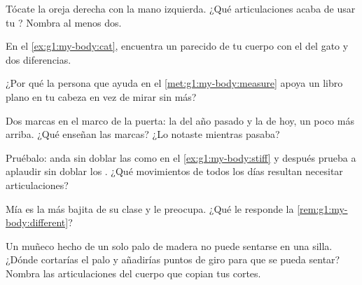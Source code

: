 \begin{exercise}[$\star$]\label{exo:g1:my-body:4}
Tócate la oreja derecha con la mano izquierda. ¿Qué articulaciones
acaba de usar tu ? Nombra al menos dos.
\end{exercise}

\begin{exercise}[$\star$]\label{exo:g1:my-body:5}
En el \cref{ex:g1:my-body:cat}, encuentra un parecido de tu cuerpo con
el del gato y dos diferencias.
\end{exercise}

\begin{exercise}[$\star$]\label{exo:g1:my-body:6}
¿Por qué la persona que ayuda en el \cref{met:g1:my-body:measure}
apoya un libro plano en tu cabeza en vez de mirar sin más?
\end{exercise}

\begin{exercise}[$\star$]\label{exo:g1:my-body:7}
Dos marcas en el marco de la puerta: la del año pasado y la de hoy, un
poco más arriba. ¿Qué enseñan las marcas? ¿Lo notaste mientras pasaba?
\end{exercise}

\begin{exercise}[$\star$]\label{exo:g1:my-body:8}
Pruébalo: anda sin doblar las  como en el
\cref{ex:g1:my-body:stiff} y después prueba a aplaudir sin doblar los
. ¿Qué movimientos de todos los días resultan necesitar
articulaciones?
\end{exercise}

\begin{exercise}[$\star\star$]\label{exo:g1:my-body:9}
Mía es la más bajita de su clase y le preocupa. ¿Qué le responde la
\cref{rem:g1:my-body:different}?
\end{exercise}

\begin{exercise}[$\star\star$]\label{exo:g1:my-body:10}
Un muñeco hecho de un solo palo de madera no puede sentarse en una
silla. ¿Dónde cortarías el palo y añadirías puntos de giro para que se
pueda sentar? Nombra las articulaciones del cuerpo que copian tus
cortes.
\end{exercise}
